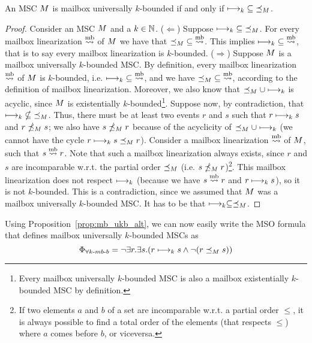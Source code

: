 \documentclass{article}
\begin{document}
\begin{proposition}\label{prop:mb_ukb_alt}
	An MSC $M$ is mailbox universally $k$-bounded if and only if $\longmapsto_k \;\subseteq\; \preceq_M$.
\end{proposition}
\begin{proof}
	Consider an MSC $M$ and a $k \in \mathbb{N}$.\newline
	($\Leftarrow$) Suppose $\longmapsto_k \;\subseteq\; \preceq_M$. For every mailbox linearization $\overset{\text{mb}}{\rightsquigarrow}$ of $M$ we have that $\preceq_M \;\subseteq\; \overset{\text{mb}}{\rightsquigarrow}$. This implies $\longmapsto_k \;\subseteq\; \overset{\text{mb}}{\rightsquigarrow}$, that is to say every mailbox linearization is $k$-bounded.\newline
	($\Rightarrow$) Suppose $M$ is a mailbox universally $k$-bounded MSC. By definition, every mailbox linearization $\overset{\text{mb}}{\rightsquigarrow}$ of $M$ is $k$-bounded, i.e. $\longmapsto_k \;\subseteq\; \overset{\text{mb}}{\rightsquigarrow}$, and we have $\preceq_M \;\subseteq\; \overset{\text{mb}}{\rightsquigarrow}$, according to the definition of mailbox linearization. Moreover, we also know that $\preceq_M \cup \longmapsto_k$ is acyclic, since $M$ is existentially $k$-bounded\footnote{Every mailbox universally $k$-bounded MSC is also a mailbox existentially $k$-bounded MSC by definition.}. Suppose now, by contradiction, that $\longmapsto_k \;\nsubseteq\; \preceq_M$. Thus, there must be at least two events $r$ and $s$ such that $r \longmapsto_k s$ and $r \npreceq_M s$; we also have $s \npreceq_M r$ because of the acyclicity of $\preceq_M \cup \longmapsto_k$ (we cannot have the cycle $r \longmapsto_k s \preceq_M r$). Consider a mailbox linearization $\overset{\text{mb}}{\rightsquigarrow}$  of $M$, such that $s \overset{\text{mb}}{\rightsquigarrow} r$. Note that such a mailbox linearization always exists, since $r$ and $s$ are incomparable w.r.t. the partial order $\preceq_M$ (i.e. $s \npreceq_M r$)\footnote{If two elements $a$ and $b$ of a set are incomparable w.r.t. a partial order $\le$, it is always possible to find a total order of the elements (that respects $\le$) where $a$ comes before $b$, or viceversa.}. This mailbox linearization does not respect $\longmapsto_k$ (because we have $s \overset{\text{mb}}{\rightsquigarrow} r$ and $r \longmapsto_k s$), so it is not $k$-bounded. This is a contradiction, since we assumed that $M$ was a mailbox universally $k$-bounded MSC. It has to be that $\longmapsto_k \subseteq \preceq_M$.
\end{proof}

Using Proposition~\ref{prop:mb_ukb_alt}, we can now easily write the MSO formula that defines mailbox universally $k$-bounded MSCs as
\[ \Phi_{\forall k\text{-}mb\text{-}b} = \neg \exists r.\exists s.(r \longmapsto_k s \wedge \neg(r \preceq_M s)) \]
\end{document}
